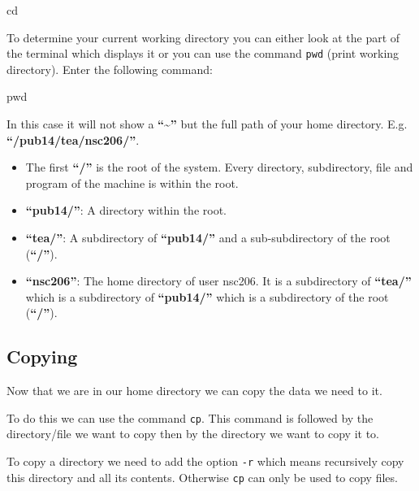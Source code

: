 \documentclass[
  letterpaper,
  DIV=11,
  numbers=noendperiod]{scrreprt}
\newenvironment{Shaded}{\begin{snugshade}}{\end{snugshade}}
\newcommand{\BuiltInTok}[1]{\textcolor[rgb]{0.00,0.23,0.31}{#1}}
\providecommand{\tightlist}{%
  \setlength{\itemsep}{0pt}\setlength{\parskip}{0pt}}\usepackage{longtable,booktabs,array}
\begin{document}
\begin{Shaded}
\begin{Highlighting}[]
\BuiltInTok{cd}
\end{Highlighting}
\end{Shaded}

To determine your current working directory you can either look at the
part of the terminal which displays it or you can use the command
\texttt{pwd} (print working directory). Enter the following command:

\begin{Shaded}
\begin{Highlighting}[]
\BuiltInTok{pwd}
\end{Highlighting}
\end{Shaded}

In this case it will not show a \textbf{``\textasciitilde{}''} but the
full path of your home directory. E.g. \textbf{``/pub14/tea/nsc206/''}.

\begin{itemize}
\tightlist
\item
  The first \textbf{``/''} is the root of the system. Every directory,
  subdirectory, file and program of the machine is within the root.
\item
  \textbf{``pub14/''}: A directory within the root.
\item
  \textbf{``tea/''}: A subdirectory of \textbf{``pub14/''} and a
  sub-subdirectory of the root (\textbf{``/''}).
\item
  \textbf{``nsc206''}: The home directory of user nsc206. It is a
  subdirectory of \textbf{``tea/''} which is a subdirectory of
  \textbf{``pub14/''} which is a subdirectory of the root
  (\textbf{``/''}).
\end{itemize}

\hypertarget{copying}{%
\subsection{Copying}\label{copying}}

Now that we are in our home directory we can copy the data we need to
it.

To do this we can use the command \texttt{cp}. This command is followed
by the directory/file we want to copy then by the directory we want to
copy it to.

To copy a directory we need to add the option \texttt{-r} which means
recursively copy this directory and all its contents. Otherwise
\texttt{cp} can only be used to copy files.
\end{document}
